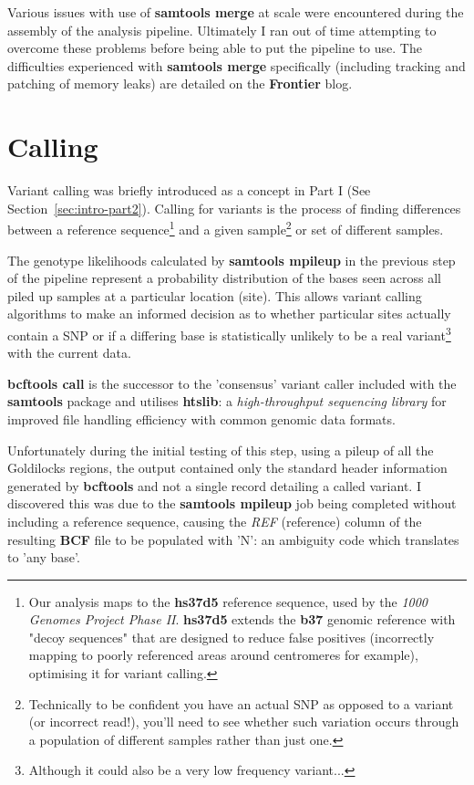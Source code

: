 Various issues with use of \textbf{samtools merge} at scale were encountered
during the assembly of the analysis pipeline. Ultimately I ran out of time
attempting to overcome these problems before being able to put the pipeline to
use. The difficulties experienced with \textbf{samtools merge} specifically
(including tracking and patching of memory leaks) are
detailed on the \textbf{Frontier} blog\citep{frontier}.



\section{Calling}

Variant calling was briefly introduced as a concept in Part I
(See Section~\ref{sec:intro-part2}). Calling for variants is the process
of finding differences between a reference sequence\footnote{Our analysis maps
    to the \textbf{hs37d5} reference sequence, used by the \textit{1000 Genomes
    Project Phase II}\citep{1k-refs}. \textbf{hs37d5} extends the \textbf{b37} genomic
    reference with "decoy sequences" that are designed to reduce false
    positives (incorrectly mapping to poorly referenced areas around centromeres for
    example\citep{biostar:decoy}), optimising it for variant
calling\citep{1k-slides}.} and a given sample\footnote{Technically to be confident
    you have an actual SNP as opposed to a variant (or incorrect read!), you'll
    need to see whether such variation occurs through a population of different
samples rather than just one.} or set of different samples.

The genotype likelihoods calculated by \textbf{samtools mpileup} in the previous
step of the pipeline represent a probability distribution of the bases seen
across all piled up samples at a particular location (site). This allows variant
calling algorithms to make an informed decision as to whether particular sites
actually contain a SNP or if a differing base is statistically unlikely to be a real
variant\footnote{Although it could also be a very low frequency variant...} with
the current data.

\textbf{bcftools call}\citep{man:bcftools-call}\citep{man:bcftools-call2} is the
successor to the 'consensus' variant caller included with the \textbf{samtools}
package and utilises \textbf{htslib}: a \textit{high-throughput sequencing
library} for improved file handling efficiency with common genomic data formats.


Unfortunately during the initial testing of this step, using a pileup of all the
Goldilocks regions, the output contained only the standard header information
generated by \textbf{bcftools} and not a single record detailing a called
variant.  I discovered this was due to the \textbf{samtools mpileup} job being
completed without including a reference sequence, causing the \textit{REF}
(reference) column of the resulting \textbf{BCF} file to be populated with 'N':
an ambiguity code which translates to 'any
base'\citep{cornish1985nomenclature}\citep{liebecq1992biochemical}.

